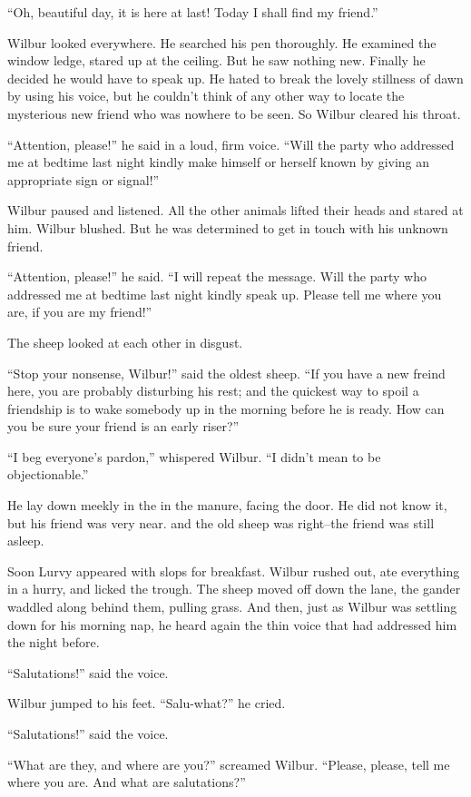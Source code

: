\documentclass[a4paper, oneside]{book}
\begin{document}
 ``Oh, beautiful day, it is here at last! Today I shall find my friend.'' 
 
Wilbur looked everywhere. He searched his pen thoroughly. He
examined the window ledge, stared up at the ceiling. But he saw
nothing new. Finally he decided he would have to speak up. He
hated to break the lovely stillness of dawn by using his voice, but
he couldn't think of any other way to locate the mysterious new
friend who was nowhere to be seen. So Wilbur cleared his throat. 

 ``Attention, please!'' he said in a loud, firm voice. ``Will the party
who addressed me at bedtime last night kindly make himself or
herself known by giving an appropriate sign or signal!''

 Wilbur paused and listened. All the other animals lifted their
heads and stared at him. Wilbur blushed. But he was determined
to get in touch with his unknown friend. 

``Attention, please!'' he said. ``I will repeat the message. Will the
party who addressed me at bedtime last night kindly speak up.
Please tell me where you are, if you are my friend!''

 The sheep looked at each other in disgust.

 ``Stop your nonsense, Wilbur!'' said the oldest sheep. ``If you have
a new freind here, you are probably disturbing his rest; and the
quickest way to spoil a friendship is to wake somebody up in the
morning before he is ready. How can you be sure your friend is an
early riser?''

 ``I beg everyone's pardon,'' whispered Wilbur. ``I didn't mean to be
objectionable.''

 He lay down meekly in the in the manure, facing the door. He did
not know it, but his friend was very near. and the old sheep was
right--the friend was still asleep. 

 Soon Lurvy appeared with slops for breakfast. Wilbur rushed out,
ate everything in a hurry, and licked the trough. The sheep moved 
off down the lane, the gander waddled along behind them, pulling
grass. And then, just as Wilbur was settling down for his morning
nap, he heard again the thin voice that had addressed him the
night before.

 ``Salutations!'' said the voice.

 Wilbur jumped to his feet. ``Salu-what?'' he cried.

 ``Salutations!'' said the voice.

 ``What are they, and where are you?'' screamed Wilbur. ``Please,
please, tell me where you are. And what are salutations?''
\end{document}
